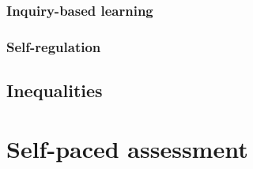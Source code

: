 \subsubsection{Inquiry-based learning}

\subsubsection{Self-regulation}


\subsection{Inequalities}
\section{Self-paced assessment}
